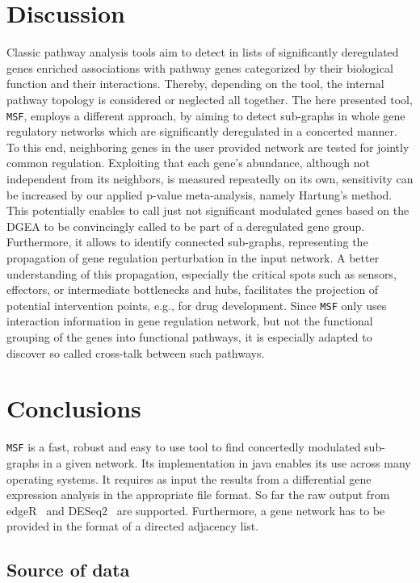 \documentclass[10pt,a4paper,twocolumn]{article}
\begin{document}
\section*{Discussion}

Classic pathway analysis tools aim to detect in lists of significantly
deregulated genes enriched associations with pathway genes categorized by
their biological function and their interactions. Thereby, depending on the
tool, the internal pathway topology is considered or neglected all
together. The here presented tool, \texttt{MSF}, employs a different
approach, by aiming to detect sub-graphs in whole gene regulatory networks
which are significantly deregulated in a concerted manner. To this end,
neighboring genes in the user provided network are tested for jointly
common regulation. Exploiting that each gene's abundance, although not
independent from its neighbors, is measured repeatedly on its own,
sensitivity can be increased by our applied p-value meta-analysis, namely
Hartung's method. This potentially enables to call just not significant
modulated genes based on the DGEA to be convincingly called to be part of a
deregulated gene group.  Furthermore, it allows to identify connected
sub-graphs, representing the propagation of gene regulation perturbation in
the input network. A better understanding of this propagation, especially
the critical spots such as sensors, effectors, or intermediate bottlenecks
and hubs, facilitates the projection of potential intervention points,
e.g., for drug development. Since \texttt{MSF} only uses interaction
information in gene regulation network, but not the functional grouping of
the genes into functional pathways, it is especially adapted to discover so
called cross-talk between such pathways.


\section*{Conclusions}

\texttt{MSF} is a fast, robust and easy to use tool to find concertedly
modulated sub-graphs in a given network. Its implementation in java enables
its use across many operating systems. It requires as input the results from
a differential gene expression analysis in the appropriate file format. So
far the raw output from edgeR~\cite{edgeR} and
DESeq2~\cite{love2014moderated} are supported. Furthermore, a gene network
has to be provided in the format of a directed adjacency list.

\subsection*{Source of data}
\end{document}
